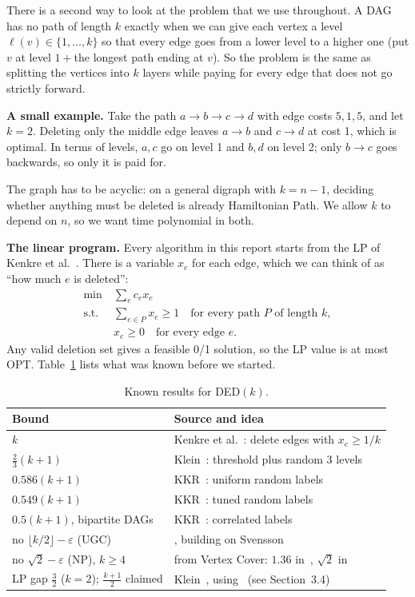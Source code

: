 \documentclass[sigconf,nonacm]{acmart}
\newcommand{\DED}{\textsc{DED}}
\begin{document}
 There is a second way to look at the problem that we use throughout. A DAG has no path of length $k$ exactly when we can give each vertex a level $\ell(v)\in\{1,\dots,k\}$ so that every edge goes from a lower level to a higher one (put $v$ at level $1+{}$the longest path ending at $v$). So the problem is the same as splitting the vertices into $k$ layers while paying for every edge that does not go strictly forward.

\textbf{A small example.} Take the path $a\to b\to c\to d$ with edge costs $5,1,5$, and let $k=2$. Deleting only the middle edge leaves $a\to b$ and $c\to d$ at cost 1, which is optimal. In terms of levels, $a,c$ go on level 1 and $b,d$ on level 2; only $b\to c$ goes backwards, so only it is paid for.

The graph has to be acyclic: on a general digraph with $k=n-1$, deciding whether anything must be deleted is already Hamiltonian Path. We allow $k$ to depend on $n$, so we want time polynomial in both.

\textbf{The linear program.} Every algorithm in this report starts from the LP of Kenkre et al.~\cite{kpps}. There is a variable $x_e$ for each edge, which we can think of as ``how much $e$ is deleted'':
\begin{align*}
\min\ &\textstyle\sum_e c_ex_e\\
\text{s.t.}\ &\textstyle\sum_{e\in P}x_e\ge1\quad\text{for every path $P$ of length $k$},\\
&x_e\ge0\quad\text{for every edge $e$}.
\end{align*}
Any valid deletion set gives a feasible 0/1 solution, so the LP value is at most OPT. Table~\ref{tab:known} lists what was known before we started.

\begin{table}[t]
\caption{Known results for \DED$(k)$.}\label{tab:known}
\small
\begin{tabular}{@{}>{\raggedright\arraybackslash}p{}>{\raggedright\arraybackslash}p{}@{}}
\toprule
Bound & Source and idea\\
\midrule
$k$ & Kenkre et al.~\cite{kpps}: delete edges with $x_e\ge1/k$\\
$\tfrac23(k+1)$ & Klein~\cite{kw}: threshold plus random 3 levels\\
$0.586(k+1)$ & KKR~\cite{kkr}: uniform random labels\\
$0.549(k+1)$ & KKR~\cite{kkr}: tuned random labels\\
$0.5(k+1)$, bipartite DAGs & KKR~\cite{kkr}: correlated labels\\
\midrule
no $\lfloor k/2\rfloor-\varepsilon$ (UGC) & \cite{kpps}, building on Svensson~\cite{sv}\\
no $\sqrt2-\varepsilon$ (NP), $k\ge4$ & from Vertex Cover: $1.36$ in~\cite{kw}, $\sqrt2$ in~\cite{kkr}\\
LP gap $\frac32$ ($k=2$); $\frac{k+1}2$ claimed & Klein~\cite{kw}, using~\cite{abglsc} (see Section~3.4)\\
\bottomrule
\end{tabular}
\end{table}
\end{document}
